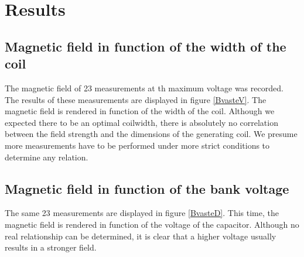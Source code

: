 \section{Results}

\subsection{Magnetic field in function of the width of the coil}

The magnetic field of 23 measurements at th maximum voltage was recorded. The 
results of these measurements are displayed in figure \ref{BvasteV}. The 
magnetic field is rendered in function of the width of the coil. Although we 
expected there to be an optimal coilwidth, there is absolutely no correlation 
between the field strength and the dimensions of the generating coil. We 
presume more measurements have to be performed under more strict conditions to 
determine any relation.


\subsection{Magnetic field in function of the bank voltage}

The same 23 measurements are displayed in figure \ref{BvasteD}. This time, the 
magnetic field is rendered in function of the voltage of the capacitor.  
Although no real relationship can be determined, it is clear that a higher 
voltage usually results in a stronger field.

